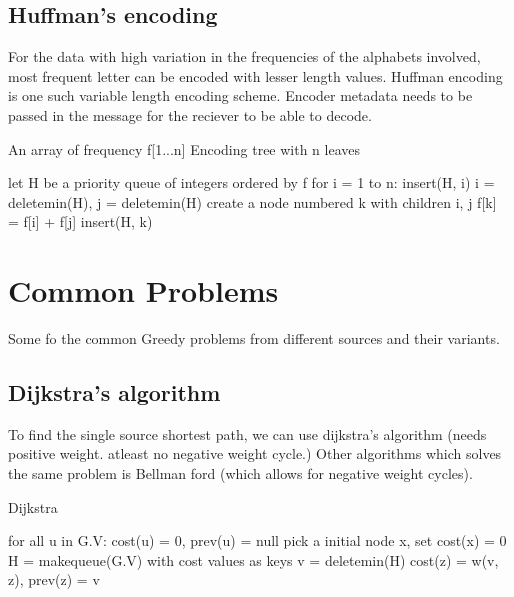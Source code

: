 \documentclass[11pt,letterpaper]{article}
\begin{document}
\subsection{Huffman's encoding}
For the data with high variation in the frequencies of the alphabets involved, most frequent letter can be encoded with lesser length values. Huffman encoding is one such variable length encoding scheme. Encoder metadata needs to be passed in the message for the reciever to be able to decode. 

\begin{algorithm}
	\algrenewcommand{}
	\algrenewcommand{}
	\caption{}
	\begin{algorithmic}[1]
		\Require An array of frequency f[1...n]
		\Ensure Encoding tree with n leaves
		
		\State let H be a priority queue of integers ordered by f
		\State for i = 1 to n: insert(H, i)
			\State i = deletemin(H), j = deletemin(H)
			\State create a node numbered k with children i, j
			\State f[k] = f[i] + f[j]
			\State insert(H, k)
		\EndFor
	\end{algorithmic}
\end{algorithm}




\section{Common Problems}
Some fo the common Greedy problems from different sources and their variants. 

\subsection{Dijkstra's algorithm}
To find the single source shortest path, we can use dijkstra's algorithm (needs positive weight. atleast no negative weight cycle.) Other algorithms which solves the same problem is Bellman ford (which allows for negative weight cycles). 
\begin{algorithm}
	\caption{Dijkstra}
	\label{alg:Dijkstra}
	\begin{algorithmic}[1]
		\State for all u in G.V: cost(u) = 0, prev(u) = null
		\State pick a initial node x, set cost(x) = 0
		\State H = makequeue(G.V) with cost values as keys
			\State v = deletemin(H)
				cost(z) = w(v, z), prev(z) = v
				\EndIf
			\EndFor
		\EndWhile
	\end{algorithmic}
\end{algorithm}
\end{document}
